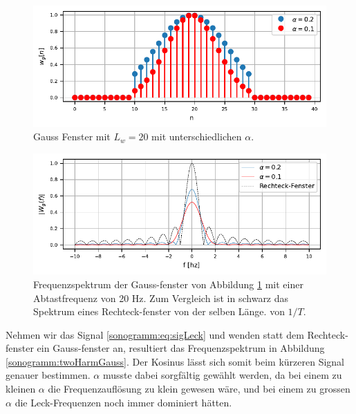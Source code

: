 \begin{figure}
    \centering
    \includegraphics{papers/sonogramm/images/gauss_time.pdf}
    \caption{Gauss Fenster mit $L_w = 20$ mit unterschiedlichen $\alpha$.
    \label{sonogramm:gausstime}
    }
\end{figure}

\begin{figure}
    \centering
    \includegraphics{papers/sonogramm/images/gauss_freq.pdf}
    \caption{Frequenzspektrum der Gauss-fenster von Abbildung \ref{sonogramm:gausstime}
    mit einer Abtastfrequenz von 20 Hz. Zum Vergleich ist in schwarz das Spektrum eines Rechteck-fenster 
    von der selben Länge.
    von $1/T$.
    \label{sonogramm:gaussfreq}
    }
\end{figure}

Nehmen wir das Signal \eqref{sonogramm:eq:sigLeck} und wenden statt dem Rechteck-fenster
ein Gauss-fenster an, resultiert das Frequenzspektrum in Abbildung \ref{sonogramm:twoHarmGauss}.
Der Kosinus lässt sich somit beim kürzeren Signal genauer bestimmen.
$\alpha$ musste dabei sorgfältig gewählt werden, da bei einem zu kleinen $\alpha$ die 
Frequenzauflösung zu klein gewesen wäre, und bei einem zu grossen $\alpha$ die Leck-Frequenzen
noch immer dominiert hätten.

